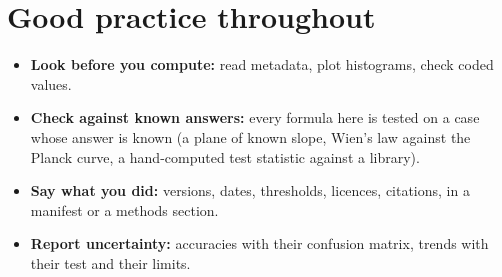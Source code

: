 \section{Good practice throughout}
\begin{itemize}
\item \textbf{Look before you compute:} read metadata, plot histograms, check coded values.
\item \textbf{Check against known answers:} every formula here is tested on a case whose answer is known (a plane of known slope, Wien's law against the Planck curve, a hand-computed test statistic against a library).
\item \textbf{Say what you did:} versions, dates, thresholds, licences, citations, in a manifest or a methods section.
\item \textbf{Report uncertainty:} accuracies with their confusion matrix, trends with their test and their limits.
\end{itemize}
